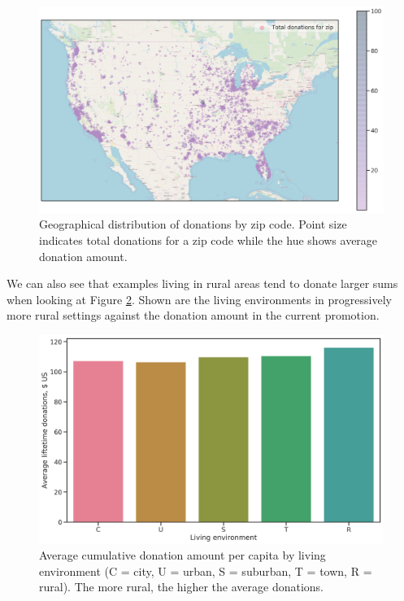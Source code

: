 \documentclass[
  11pt,
  a4paper,
  DIV=12,captions=tableheading,oneside,titlepage=firstiscover,abstracton]{scrreprt}
\begin{document}
\begin{figure}

{\centering \includegraphics[width=1\linewidth]{figures/eda/donations-geographical} 

}

\caption{Geographical distribution of donations by zip code. Point size indicates total donations for a zip code while the hue shows average donation amount.}\label{fig:donations-geo}
\end{figure}

We can also see that examples living in rural areas tend to donate larger sums when looking at Figure \ref{fig:donations-le}. Shown are the living environments in progressively more rural settings against the donation amount in the current promotion.



\begin{figure}

{\centering \includegraphics[width=0.6\linewidth]{figures/eda/avg-donations-per-capita-by-living-environment} 

}

\caption{Average cumulative donation amount per capita by living environment (C = city, U = urban, S = suburban, T = town, R = rural). The more rural, the higher the average donations.}\label{fig:donations-le}
\end{figure}
\end{document}
